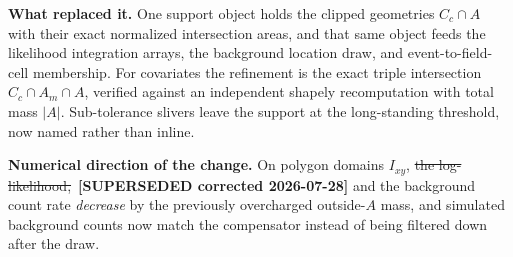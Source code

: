 \documentclass[
  10pt,
]{article}
\newcommand{\amdstrike}[1]{\sout{#1}}
\newcommand{\amdstrike}[1]{\textcolor{supcolor}{#1}}
\newcommand{\supsd}[2]{{\color{supcolor}\amdstrike{#2}}~{\color{amdcolor}\footnotesize\textbf{[SUPERSEDED #1]}}}
\begin{document}
\textbf{What replaced it.} One support object holds the clipped geometries \(C_c \cap A\) with their exact normalized intersection areas, and that same object feeds the likelihood integration arrays, the background location draw, and event-to-field-cell membership. For covariates the refinement is the exact triple intersection \(C_c \cap A_m \cap A\), verified against an independent shapely recomputation with total mass \(|A|\). Sub-tolerance slivers leave the support at the long-standing threshold, now named rather than inline.

\textbf{Numerical direction of the change.} On polygon domains \(I_{xy}\), \supsd{corrected 2026-07-28}{the log-likelihood,} and the background count rate \emph{decrease} by the previously overcharged outside-\(A\) mass, and simulated background counts now match the compensator instead of being filtered down after the draw.
\end{document}
